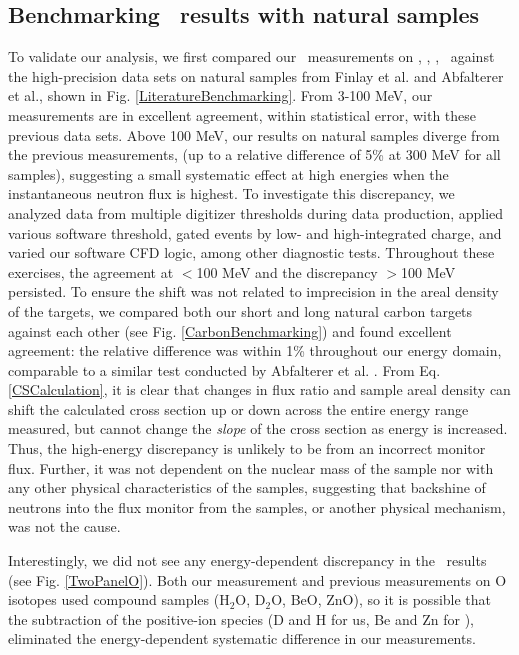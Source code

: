 \subsection{Benchmarking \tot\ results with natural samples}
To validate our analysis, we first compared our \tot\ measurements on \cNat,
\niNat, \snNat, \pbNat\ against the high-precision data sets on natural samples from 
Finlay et al.\cite{Finlay1993} and Abfalterer et al.\cite{Abfalterer2001}, shown in Fig.
\ref{LiteratureBenchmarking}. From 3-100 MeV, our measurements are in excellent
agreement, within statistical error, with these previous data sets. Above 100 MeV, our results 
on natural samples diverge from the previous measurements,
(up to a relative difference of 5\% at 300 MeV for all 
samples), suggesting a small systematic effect at high energies when the instantaneous neutron 
flux is highest. To investigate this discrepancy, we analyzed data from multiple digitizer 
thresholds during data production, applied various software threshold, gated events by low- 
and high-integrated charge, and varied our software CFD logic, among other diagnostic tests. 
Throughout these exercises, the agreement at $<$100 MeV and the discrepancy $>$100 MeV 
persisted. To ensure the shift was not related to imprecision in the areal
density of the targets, we compared both our short and long natural carbon targets against 
each other (see Fig. \ref{CarbonBenchmarking}) and found excellent agreement: the relative 
difference was within 1\% throughout our energy domain, comparable to a similar test
conducted by Abfalterer et al. \cite{Abfalterer2001}. From Eq. \ref{CSCalculation},
it is clear that changes in flux ratio and sample areal
density can shift the calculated cross section up or down across the entire
energy range measured, but cannot change the \textit{slope} of the cross section
as energy is increased. Thus, the high-energy discrepancy is unlikely to be from
an incorrect monitor flux. Further, it was not dependent on the nuclear mass of
the sample nor with any other physical characteristics of the samples,
suggesting that backshine of neutrons into the flux monitor from the samples, or another 
physical mechanism, was not the cause.

Interestingly, we did not see any energy-dependent 
discrepancy in the \oSix\ results (see Fig. \ref{TwoPanelO}). Both our measurement and previous
measurements on O isotopes used compound samples (H$_{2}$O, D$_{2}$O, BeO, ZnO), so it is possible 
that the subtraction of the positive-ion species (D and H for us, Be and Zn for \cite{Finlay1993}), 
eliminated the energy-dependent systematic difference in our measurements.

